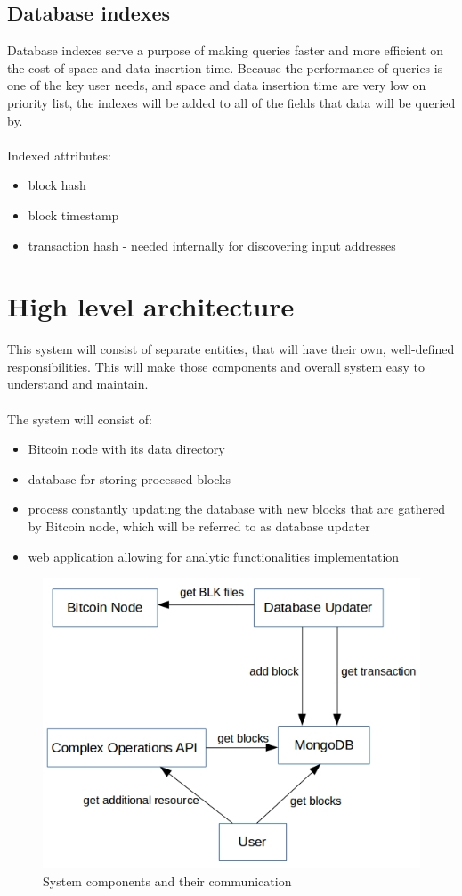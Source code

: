 \documentclass[12pt, en, eng, twoside, final]{mgr}
\begin{document}
 

\subsection{Database indexes}

Database indexes serve a purpose of making queries faster and more efficient on the cost of space and data insertion time.
Because the performance of queries is one of the key user needs, and space and data insertion time are very low on priority list, the indexes will be added to all of the fields that data will be queried by.
\\
\\
Indexed attributes:
\begin{itemize}
\item
block hash
\item
block timestamp
\item
transaction hash - needed internally for discovering input addresses
\end{itemize} 


\section{High level architecture}
This system will consist of separate entities, that will have their own, well-defined responsibilities. This will make those components and overall system easy to understand and maintain.
\\
\\
The system will consist of:
\begin{itemize}
\item
Bitcoin node with its data directory
\item
database for storing processed blocks
\item
process constantly updating the database with new blocks that are gathered by Bitcoin node, which will be referred to as database updater
\item
web application allowing for analytic functionalities implementation
\end{itemize}

\begin{figure}[H]
  \includegraphics[width=0.8\linewidth]{component-diagram.png}
  \caption{System components and their communication}
  \label{fig:system-components-and-their-communication}
\end{figure}
\end{document}
